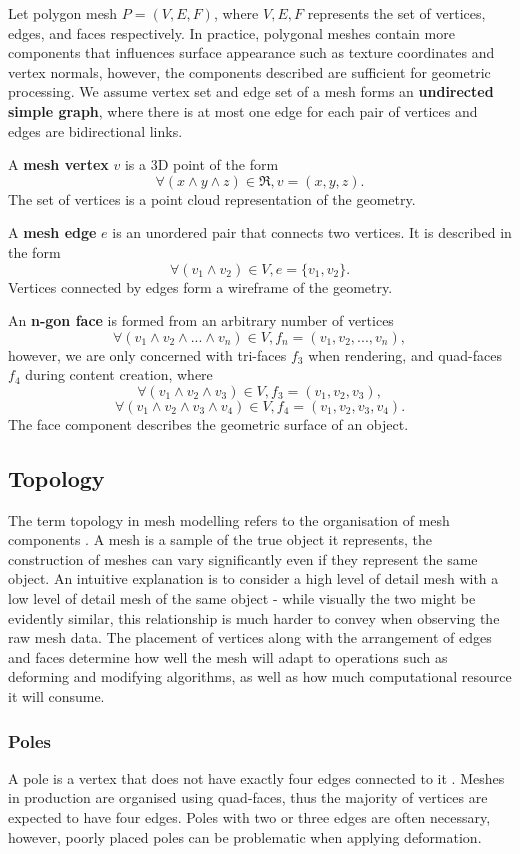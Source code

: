 \documentclass[ %
author={Dillon Keith Diep},
supervisor={Dr. Carl Henrik Ek},
degree={MEng},
title={ART-CG Hair:},
subtitle={Assisted Real-time Content Generation of Stylised Virtual Hair},
type={Research},
year={2017} ]{dissertation}
\begin{document}
	Let polygon mesh $P = (V, E, F)$, where $V, E, F$ represents the set of vertices, edges, and faces respectively. In practice, polygonal meshes contain more components that influences surface appearance such as texture coordinates and vertex normals, however, the components described are sufficient for geometric processing. We assume vertex set and edge set of a mesh forms an \textbf{undirected simple graph}, where there is at most one edge for each pair of vertices and edges are bidirectional links.
	
	A \textbf{mesh vertex} $v$ is a 3D point of the form
	$$\forall (x \land y \land z) \in \Re, v = (x, y, z).$$
	The set of vertices is a point cloud representation of the geometry. 
	
	A \textbf{mesh edge} $e$ is an unordered pair that connects two vertices. It is described in the form
	$$\forall (v_1 \land v_2) \in V, e = \{v_1, v_2\}.$$
	Vertices connected by edges form a wireframe of the geometry. 
	
	An \textbf{n-gon face} is formed from an arbitrary number of vertices 
	$$\forall (v_1 \land v_2 \land ... \land v_n) \in V, f_n = (v_1, v_2,..., v_n),$$ 
	however, we are only concerned with tri-faces $f_3$ when rendering, and quad-faces $f_4$ during content creation, where
	$$\forall (v_1 \land v_2 \land v_3) \in V, f_3 = (v_1, v_2, v_3),$$
	$$\forall (v_1 \land v_2 \land v_3 \land v_4) \in V, f_4 = (v_1, v_2, v_3, v_4).$$
	The face component describes the geometric surface of an object.
	
	\subsection{Topology}
	The term topology in mesh modelling refers to the organisation of mesh components \cite[p.91]{blenderstudio}. A mesh is a sample of the true object it represents, the construction of meshes can vary significantly even if they represent the same object. An intuitive explanation is to consider a high level of detail mesh with a low level of detail mesh of the same object - while visually the two might be evidently similar, this relationship is much harder to convey when observing the raw mesh data. The placement of vertices along with the arrangement of edges and faces determine how well the mesh will adapt to operations such as deforming and modifying algorithms, as well as how much computational resource it will consume.
	
	\subsubsection{Poles}
	A pole is a vertex that does not have exactly four edges connected to it \cite[p.92]{blenderstudio}. Meshes in production are organised using quad-faces, thus the majority of vertices are expected to have four edges. Poles with two or three edges are often necessary, however, poorly placed poles can be problematic when applying deformation.
	
\end{document}
